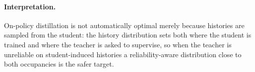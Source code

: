\paragraph{Interpretation.}
On-policy distillation is not automatically optimal merely because histories are
sampled from the student: the history distribution sets both where the student is
trained and where the teacher is asked to supervise, so when the teacher is unreliable
on student-induced histories a reliability-aware distribution close to both occupancies
is the safer target.
